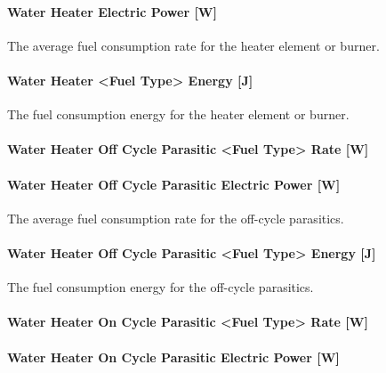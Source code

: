 \paragraph{Water Heater Electric Power {[}W{]}}\label{water-heater-electric-power-w}

The average fuel consumption rate for the heater element or burner.

\paragraph{Water Heater \textless{}Fuel Type\textgreater{} Energy {[}J{]}}\label{water-heater-fuel-type-energy-j}

The fuel consumption energy for the heater element or burner.

\paragraph{Water Heater Off Cycle Parasitic \textless{}Fuel Type\textgreater{} Rate {[}W{]}}\label{water-heater-off-cycle-parasitic-fuel-type-rate-w}

\paragraph{Water Heater Off Cycle Parasitic Electric Power {[}W{]}}\label{water-heater-off-cycle-parasitic-electric-power-w-000}

The average fuel consumption rate for the off-cycle parasitics.

\paragraph{Water Heater Off Cycle Parasitic \textless{}Fuel Type\textgreater{} Energy {[}J{]}}\label{water-heater-off-cycle-parasitic-fuel-type-energy-j}

The fuel consumption energy for the off-cycle parasitics.

\paragraph{Water Heater On Cycle Parasitic \textless{}Fuel Type\textgreater{} Rate {[}W{]}}\label{water-heater-on-cycle-parasitic-fuel-type-rate-w}

\paragraph{Water Heater On Cycle Parasitic Electric Power {[}W{]}}\label{water-heater-on-cycle-parasitic-electric-power-w-000}

